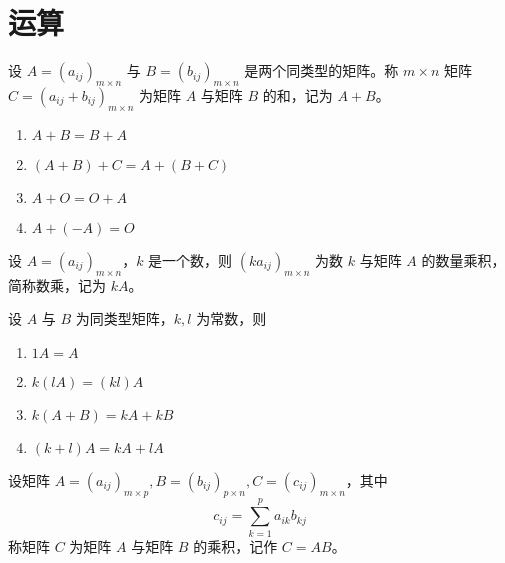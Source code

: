 \documentclass{ctexbook}
\begin{document}
\section{运算}

\begin{definition}[矩阵加法]
    设 $A=(a_{ij})_{m\times n}$ 与 $B=(b_{ij})_{m\times n}$ 是两个同类型的矩阵。称 $m\times n$ 矩阵 $C=(a_{ij}+b_{ij})_{m\times n}$ 为矩阵 $A$ 与矩阵 $B$ 的和，记为 $A+B$。
\end{definition}

\begin{proposition}[矩阵加法的性质]
    \begin{enumerate}
        \item $A+B=B+A$ 
        \item $(A+B)+C=A+(B+C)$ 
        \item $A+O=O+A$
        \item $A+(-A)=O$
    \end{enumerate}
\end{proposition}

\begin{definition}[数乘矩阵]
    设 $A=(a_{ij})_{m\times n}$，$k$ 是一个数，则 $(ka_{ij})_{m\times n}$ 为数 $k$ 与矩阵 $A$ 的数量乘积，简称数乘，记为 $kA$。
\end{definition}

\begin{proposition}[数乘矩阵的性质]
    设 $A$ 与 $B$ 为同类型矩阵，$k,l$ 为常数，则
    \begin{enumerate}
        \item $1A=A$
        \item $k(lA)=(kl)A$
        \item $k(A+B)=kA+kB$
        \item $(k+l)A=kA+lA$
    \end{enumerate}
\end{proposition}

\begin{definition}[矩阵乘法]
    设矩阵 $A=(a_{ij})_{m\times p},B=(b_{ij})_{p\times n},C=(c_{ij})_{m\times n}$，其中
    \begin{equation}
        c_{ij}=\sum_{k=1}^p a_{ik}b_{kj}
    \end{equation}
    称矩阵 $C$ 为矩阵 $A$ 与矩阵 $B$ 的乘积，记作 $C=AB$。
\end{definition}
\end{document}
